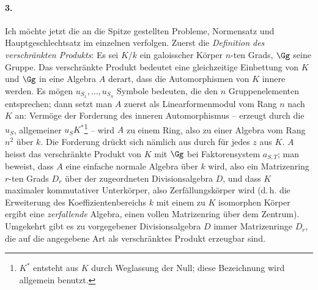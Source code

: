 \paragraph{3.}
Ich möchte jetzt die an die Spitze gestellten Probleme, Normensatz und Hauptgeschlechtsatz im einzelnen verfolgen. Zuerst die \emph{Definition des verschränkten Produkts}: Es sei \(K/k\) ein galoisscher Körper \(n\)-ten Grads, \(\Gg\) seine Gruppe. Das verschränkte Produkt bedeutet eine gleichzeitige Einbettung von \(K\) und \(\Gg\) in eine Algebra \(A\) derart, dass die Automorphismen von \(K\) innere werden. Es mögen \(u_{S_1},\ldots,u_{S_n}\) Symbole bedeuten, die den \(n\) Gruppenelementen entsprechen; dann setzt man \(A\) zuerst als Linearformenmodul vom Rang \(n\) nach \(K\) an:
Vermöge der Forderung des inneren Automorphismus -- erzeugt durch die \(u_S\), allgemeiner \(u_SK^\ast\)\footnote{\(K^\ast\) entsteht aus \(K\) durch Weglassung der Null; diese Bezeichnung wird allgemein benutzt.} -- wird \(A\) zu einem Ring, also zu einer Algebra vom Rang \(n^2\) über \(k\). Die Forderung drückt sich nämlich aus durch
für jedes \(z\) aus \(K\).
\(A\) heisst das verschränkte Produkt von \(K\) mit \(\Gg\) bei Faktorensystem \(a_{S,T}\); man beweist, dass \(A\) eine einfache normale Algebra über \(k\) wird, also ein Matrizenring \(r\)-ten Grads \(D_r\) über der zugeordneten Divisionsalgebra \(D\), und dass \(K\) maximaler kommutativer Unterkörper, also Zerfällungskörper wird (d.\,h. die Erweiterung des Koeffizientenbereichs \(k\) mit einem zu \(K\) isomorphen Körper ergibt eine \emph{zerfallende} Algebra, einen vollen Matrizenring über dem Zentrum). Umgekehrt gibt es zu vorgegebener Divisionsalgebra \(D\) immer Matrizenringe \(D_r\), die auf die angegebene Art als verschränktes Produkt erzeugbar sind.


